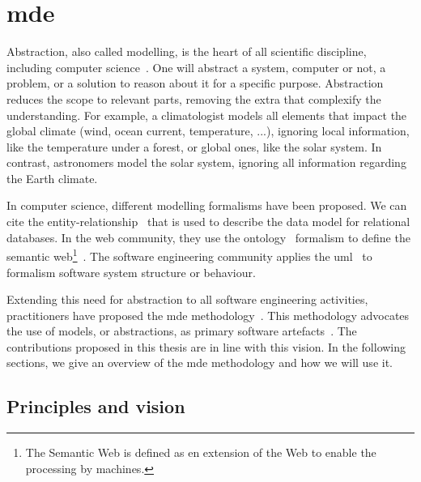 \section[Model-Driven Engineering]{\glsdesc{mde}}
\label{sec:back:mde}

Abstraction, also called modelling, is the heart of all scientific discipline, including computer science~\cite{DBLP:journals/cacm/Kramer07}.
One will abstract a system, computer or not, a problem, or a solution to reason about it for a specific purpose.
Abstraction reduces the scope to relevant parts, removing the extra that complexify the understanding.
For example, a climatologist models all elements that impact the global climate (wind, ocean current, temperature, ...), ignoring local information, like the temperature under a forest, or global ones, like the solar system.
In contrast, astronomers model the solar system, ignoring all information regarding the Earth climate.

In computer science, different modelling formalisms have been proposed. 
We can cite the entity-relationship~\cite{DBLP:journals/tods/Chen76} that is used to describe the data model for relational databases.
In the web community, they use the ontology~\cite{DBLP:journals/ijmms/Gruber95} formalism to define the semantic web\footnote{The Semantic Web is defined as en extension of the Web to enable the processing by machines.}~\cite{berners2001semantic}.
The software engineering community applies the \gls{uml}~\cite{omg2017umlspec} to formalism software system structure or behaviour.

Extending this need for abstraction to all software engineering activities, practitioners have proposed the \gls{mde} methodology~\cite{DBLP:journals/computer/Schmidt06,DBLP:conf/ifm/Kent02}.
This methodology advocates the use of models, or abstractions, as primary software artefacts~\cite{DBLP:journals/software/WhittleHR14}.
The contributions proposed in this thesis are in line with this vision.
In the following sections, we give an overview of the \gls{mde} methodology and how we will use it.


\subsection{Principles and vision}

